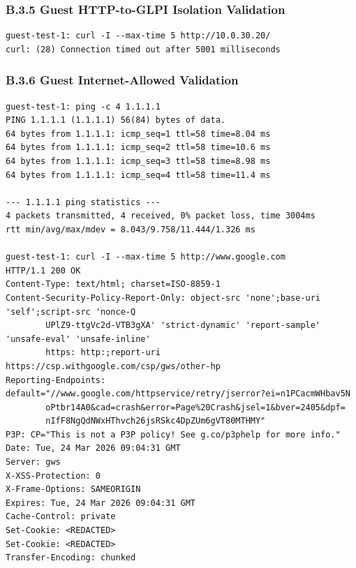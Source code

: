 \documentclass[11pt]{article}
\begin{document}

\subsubsection{B.3.5 Guest HTTP-to-GLPI Isolation Validation}
\label{sec:appendix-b-guest-http-to-glpi-isolation-validation}

\begin{verbatim}
guest-test-1: curl -I --max-time 5 http://10.0.30.20/
curl: (28) Connection timed out after 5001 milliseconds
\end{verbatim}


\subsubsection{B.3.6 Guest Internet-Allowed Validation}
\label{sec:appendix-b-guest-internet-allowed-validation}

\begin{verbatim}
guest-test-1: ping -c 4 1.1.1.1
PING 1.1.1.1 (1.1.1.1) 56(84) bytes of data.
64 bytes from 1.1.1.1: icmp_seq=1 ttl=58 time=8.04 ms
64 bytes from 1.1.1.1: icmp_seq=2 ttl=58 time=10.6 ms
64 bytes from 1.1.1.1: icmp_seq=3 ttl=58 time=8.98 ms
64 bytes from 1.1.1.1: icmp_seq=4 ttl=58 time=11.4 ms

--- 1.1.1.1 ping statistics ---
4 packets transmitted, 4 received, 0% packet loss, time 3004ms
rtt min/avg/max/mdev = 8.043/9.758/11.444/1.326 ms

guest-test-1: curl -I --max-time 5 http://www.google.com
HTTP/1.1 200 OK
Content-Type: text/html; charset=ISO-8859-1
Content-Security-Policy-Report-Only: object-src 'none';base-uri 'self';script-src 'nonce-Q
        UPlZ9-ttgVc2d-VTB3gXA' 'strict-dynamic' 'report-sample' 'unsafe-eval' 'unsafe-inline' 
        https: http:;report-uri https://csp.withgoogle.com/csp/gws/other-hp
Reporting-Endpoints: default="//www.google.com/httpservice/retry/jserror?ei=n1PCacmWHbav5N
        oPtbr14A0&cad=crash&error=Page%20Crash&jsel=1&bver=2405&dpf=
        nIfF8NgQdNWxHThvch26jsRSkc4DpZUm6gVT80MTHMY"
P3P: CP="This is not a P3P policy! See g.co/p3phelp for more info."
Date: Tue, 24 Mar 2026 09:04:31 GMT
Server: gws
X-XSS-Protection: 0
X-Frame-Options: SAMEORIGIN
Expires: Tue, 24 Mar 2026 09:04:31 GMT
Cache-Control: private
Set-Cookie: <REDACTED>
Set-Cookie: <REDACTED>
Transfer-Encoding: chunked
\end{verbatim}
\end{document}
